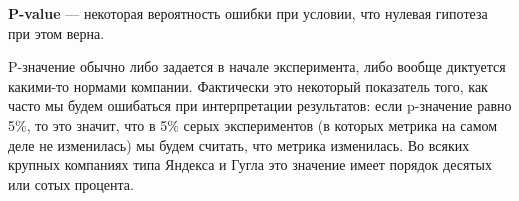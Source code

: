 \textbf{P-value} --- некоторая вероятность ошибки при условии, что нулевая гипотеза при этом верна.

P-значение обычно либо задается в начале эксперимента, либо вообще диктуется какими-то нормами компании. Фактически это некоторый показатель того, как часто мы будем ошибаться при интерпретации результатов: если p-значение равно 5\%, то это значит, что в 5\% серых экспериментов (в которых метрика на самом деле не изменилась) мы будем считать, что метрика изменилась. Во всяких крупных компаниях типа Яндекса и Гугла это значение имеет порядок десятых или сотых процента. 